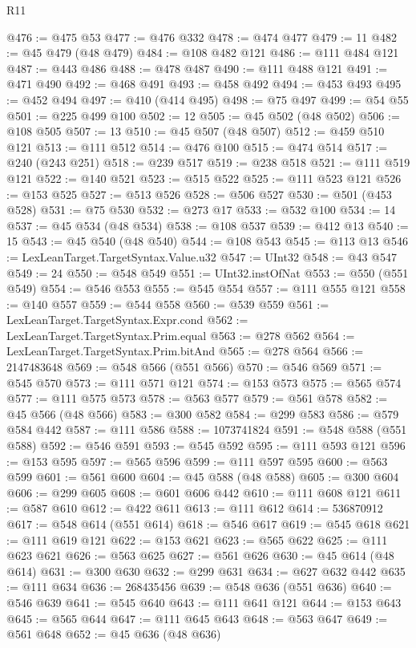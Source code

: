 \begin{lexlean}{R11}
\begin{coremodule}
{{{{{{{{{{{{{{{{{{{{{{{{{{{{{{{{{{{{{{{{{{{{{{{{{{{{{{{{{{{{{{{{{{{{{{{{{{{{{{{{{{@476 := @475 @53
@477 := @476 @332
@478 := @474 @477
@479 := 11
@482 := @45 @479 (@48 @479)
@484 := @108 @482 @121
@486 := @111 @484 @121
@487 := @443 @486
@488 := @478 @487
@490 := @111 @488 @121
@491 := @471 @490
@492 := @468 @491
@493 := @458 @492
@494 := @453 @493
@495 := @452 @494
@497 := @410 (@414 @495)
@498 := @75 @497
@499 := @54 @55
@501 := @225 @499 @100
@502 := 12
@505 := @45 @502 (@48 @502)
@506 := @108 @505
@507 := 13
@510 := @45 @507 (@48 @507)
@512 := @459 @510 @121
@513 := @111 @512
@514 := @476 @100
@515 := @474 @514
@517 := @240 (@243 @251)
@518 := @239 @517
@519 := @238 @518
@521 := @111 @519 @121
@522 := @140 @521
@523 := @515 @522
@525 := @111 @523 @121
@526 := @153 @525
@527 := @513 @526
@528 := @506 @527
@530 := @501 (@453 @528)
@531 := @75 @530
@532 := @273 @17
@533 := @532 @100
@534 := 14
@537 := @45 @534 (@48 @534)
@538 := @108 @537
@539 := @412 @13
@540 := 15
@543 := @45 @540 (@48 @540)
@544 := @108 @543
@545 := @113 @13
@546 := LexLeanTarget.TargetSyntax.Value.u32
@547 := UInt32
@548 := @43 @547
@549 := 24
@550 := @548 @549
@551 := UInt32.instOfNat
@553 := @550 (@551 @549)
@554 := @546 @553
@555 := @545 @554
@557 := @111 @555 @121
@558 := @140 @557
@559 := @544 @558
@560 := @539 @559
@561 := LexLeanTarget.TargetSyntax.Expr.cond
@562 := LexLeanTarget.TargetSyntax.Prim.equal
@563 := @278 @562
@564 := LexLeanTarget.TargetSyntax.Prim.bitAnd
@565 := @278 @564
@566 := 2147483648
@569 := @548 @566 (@551 @566)
@570 := @546 @569
@571 := @545 @570
@573 := @111 @571 @121
@574 := @153 @573
@575 := @565 @574
@577 := @111 @575 @573
@578 := @563 @577
@579 := @561 @578
@582 := @45 @566 (@48 @566)
@583 := @300 @582
@584 := @299 @583
@586 := @579 @584 @442
@587 := @111 @586
@588 := 1073741824
@591 := @548 @588 (@551 @588)
@592 := @546 @591
@593 := @545 @592
@595 := @111 @593 @121
@596 := @153 @595
@597 := @565 @596
@599 := @111 @597 @595
@600 := @563 @599
@601 := @561 @600
@604 := @45 @588 (@48 @588)
@605 := @300 @604
@606 := @299 @605
@608 := @601 @606 @442
@610 := @111 @608 @121
@611 := @587 @610
@612 := @422 @611
@613 := @111 @612
@614 := 536870912
@617 := @548 @614 (@551 @614)
@618 := @546 @617
@619 := @545 @618
@621 := @111 @619 @121
@622 := @153 @621
@623 := @565 @622
@625 := @111 @623 @621
@626 := @563 @625
@627 := @561 @626
@630 := @45 @614 (@48 @614)
@631 := @300 @630
@632 := @299 @631
@634 := @627 @632 @442
@635 := @111 @634
@636 := 268435456
@639 := @548 @636 (@551 @636)
@640 := @546 @639
@641 := @545 @640
@643 := @111 @641 @121
@644 := @153 @643
@645 := @565 @644
@647 := @111 @645 @643
@648 := @563 @647
@649 := @561 @648
@652 := @45 @636 (@48 @636)
}}}}}}}}}}}}}}}}}}}}}}}}}}}}}}}}}}}}}}}}}}}}}}}}}}}}}}}}}}}}}}}}}}}}}}}}}}}}}}}}}}
\end{coremodule}
\end{lexlean}
